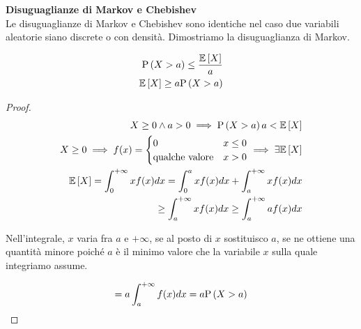\begin{defn}
    \textbf{Disuguaglianze di Markov e Chebishev} \\
    Le disuguaglianze di Markov e Chebishev sono identiche nel caso due
    variabili aleatorie siano discrete o con densità. Dimostriamo la
    disuguaglianza di Markov.

    \begin{prop}
        \begin{equation*}
            \begin{aligned}
                \text{P}\left(X > a\right) \le \dfrac{\mathbb{E}\left[X\right]}{a} \\
                \mathbb{E}\left[X\right] \geq a \text{P}\left(X > a\right)
            \end{aligned}
        \end{equation*}
    \end{prop}

    \begin{proof}
        \begin{equation*}
            \begin{aligned}
                X \geq 0 \land a > 0 \implies \text{P}\left(X > a\right) a < \mathbb{E}\left[X\right] \\
                X \geq 0 \implies f(x) = \begin{cases}
                    0 & x \leq 0 \\
                    \text{qualche valore} & x > 0
                \end{cases} \implies \exists \mathbb{E}\left[X\right] \\
                \mathbb{E}\left[X\right] = \int_{0}^{+\infty} x f(x) dx = \int_{0}^{a} x f(x) dx + \int_{a}^{+\infty} x f(x) dx \\
                \geq \int_{a}^{+\infty} x f(x) dx \geq \int_{a}^{+\infty} a f(x) dx
            \end{aligned}
        \end{equation*}

        Nell'integrale, $x$ varia fra $a$ e $+\infty$, se al posto di $x$
        sostituisco $a$, se ne ottiene una quantità minore poiché $a$ è il
        minimo valore che la variabile $x$ sulla quale integriamo assume.

        \begin{equation*}
            \begin{aligned}
                = a \int_{a}^{+\infty} f(x) dx = a \text{P}\left(X > a\right)
            \end{aligned}
        \end{equation*}

    \end{proof}
\end{defn}
